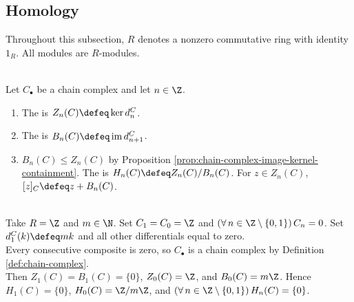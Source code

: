 \subsection{Homology}

Throughout this subsection, $R$ denotes a nonzero commutative ring with identity $1_R$. All modules are $R$-modules.

\begin{definition} \label{def:cycles-boundaries-homology} \\
Let $C_\bullet$ be a chain complex and let $n\in\Z$.
\begin{enumerate}[label=(\roman*)]
\setlength{\itemsep}{0pt}
\item The  is $Z_n(C)\defeq\ker d^C_n$.
\item The  is $B_n(C)\defeq\operatorname{im}d^C_{n+1}$.
\item $B_n(C)\leq Z_n(C)$ by Proposition \ref{prop:chain-complex-image-kernel-containment}. The  is $H_n(C)\defeq Z_n(C)/B_n(C)$. For $z\in Z_n(C)$, $[z]_C\defeq z+B_n(C)$.
\end{enumerate}
\end{definition}

\begin{example} \label{ex:two-term-integer-complex-homology} \\
Take $R=\Z$ and $m\in\N$. Set $C_1=C_0=\Z$ and $(\forall\,n\in\Z\setminus\{0,1\})\,C_n=0$. Set $d^C_1(k)\defeq mk$ and all other differentials equal to zero.\\
Every consecutive composite is zero, so $C_\bullet$ is a chain complex by Definition \ref{def:chain-complex}.\\
Then $Z_1(C)=B_1(C)=\{0\}$, $Z_0(C)=\Z$, and $B_0(C)=m\Z$. Hence $H_1(C)=\{0\}$, $H_0(C)=\Z/m\Z$, and $(\forall\,n\in\Z\setminus\{0,1\})\,H_n(C)=\{0\}$.
\end{example}

